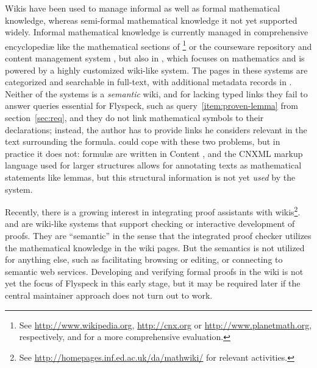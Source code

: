 \label{sec:math-wiki}

Wikis have been used to manage informal as well as formal mathematical knowledge, whereas
semi-formal mathematical knowledge it not yet supported widely.
Informal mathematical knowledge is currently managed in comprehensive encyclopediæ like
the mathematical sections of \footnote{See
  \url{http://www.wikipedia.org}, \url{http://cnx.org} or \url{http://www.planetmath.org},
  respectively, and\cite{Lange:swmkm-tr07} for a more comprehensive evaluation.} or the
courseware repository and content management system
\footnotemark[\value{footnote}], but also in
\footnotemark[\value{footnote}], which focuses on mathematics and is
powered by a highly customized wiki-like system.  The pages in these systems are
categorized and searchable in full-text, with additional metadata records in
.  Neither of the systems is a \emph{semantic} wiki, and for lacking
typed links they fail to answer queries essential for Flyspeck, such as
query~\ref{item:proven-lemma} from section~\ref{sec:req}, and they do not link
mathematical symbols to their declarations; instead, the author has to provide links he
considers relevant in the text surrounding the formula.   could cope
with these two problems, but in practice it does not: formulæ are written in Content
{\mathml}\cite{CarlisleEd:MathML07}, and the CNXML markup language used for larger
structures allows for annotating texts as mathematical statements like
lemmas\cite{connexions05:cnxml}, but this structural information is not yet \emph{used}
by the system.

Recently, there is a growing interest in integrating proof assistants
with wikis\footnote{See
  \url{http://homepages.inf.ed.ac.uk/da/mathwiki/} for relevant
  activities.}.   and  are
wiki-like systems that support checking or interactive development of
proofs. They are ``semantic'' in the sense that the integrated proof
checker utilizes the mathematical knowledge in the wiki pages.  But
the semantics is not utilized for anything else, such as facilitating
browsing or editing, or connecting to semantic web services.
Developing and verifying formal proofs in the wiki is not yet the
focus of Flyspeck in this early stage, but it may be required later if
the central maintainer approach does not turn out to
work.

